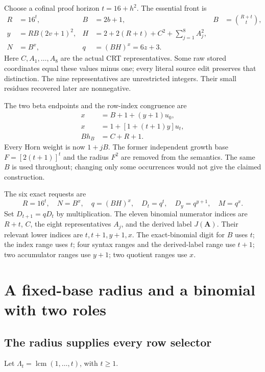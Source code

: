 \documentclass[11pt]{article}
\theoremstyle{remark}\newtheorem{remark}[theorem]{Remark}
\newcommand{\lcm}{\operatorname{lcm}}
\begin{document}
Choose a cofinal proof horizon $t=16+h^2$. The essential front is
\begin{align}
 R&=16^t,& B&=2b+1,& B&=\binom{R+t}{t},\label{eq:front1}\\
 y&=RB(2v+1)^2,&
 H&=2+2(R+t)+C^2+\sum_{j=1}^{8}A_j^2,\label{eq:front2}\\
 N&=B^x,& q&=(BH)^x=6z+3.&\label{eq:front3}
\end{align}
Here $C,A_1,\ldots,A_8$ are the actual CRT representatives. Some raw
stored coordinates equal these values minus one; every literal source
edit preserves that distinction. The nine representatives are unrestricted
integers. Their small residues recovered later are nonnegative.

The two beta endpoints and the row-index congruence are
\begin{align}
 x&=B+1+(y+1)u_0,\label{eq:initial}\\
 x&=1+[1+(t+1)y]u_t,\label{eq:final}\\
 B h_B&=C+R+1.\label{eq:index}
\end{align}
Every Horn weight is now $1+jB$. The former independent growth base
$F=[2(t+1)]^t$ and the radius $F^2$ are removed from the semantics.
The same $B$ is used throughout; changing only some occurrences would
not give the claimed construction.

The six exact requests are
\begin{equation}\label{eq:six}
 R=16^t,\quad N=B^x,\quad q=(BH)^x,\quad
 D_t=q^t,\quad D_y=q^{y+1},\quad M=q^x.
\end{equation}
Set $D_{t+1}=qD_t$ by multiplication. The eleven binomial numerator
indices are $R+t$, $C$, the eight representatives $A_j$, and the
derived label $J(\boldsymbol A)$. Their relevant lower indices are
$t,t+1,y+1,x$. The exact-binomial digit for $B$ uses $t$;
the index range uses $t$; four syntax ranges and the derived-label
range use $t+1$; two accumulator ranges use $y+1$; two quotient
ranges use $x$.

\section{A fixed-base radius and a binomial with two roles}

\subsection{The radius supplies every row selector}

Let $\Lambda_t=\lcm(1,\ldots,t)$, with $t\ge1$.
\end{document}
